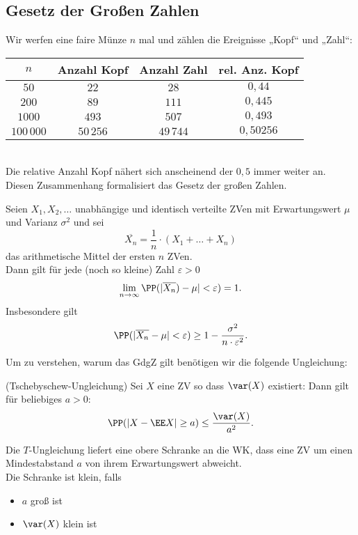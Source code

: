 \documentclass{scrreprt}
\begin{document}
\subsection{Gesetz der Großen Zahlen}
 Wir werfen eine faire Münze $n$ mal und zählen die Ereignisse „Kopf“ und „Zahl“:\\
\begin{tabular}{c | c | c | c}
	$n$ & Anzahl Kopf & Anzahl Zahl & rel. Anz. Kopf\\\hline
	$50$ & $22$ & $28$ & $0,44$\\
	$200$& $89$& $111$ & $0,445$\\
	$1000$ & $493$& $507$& $0,493$\\
	$100\,000$& $50\,256$&$49\,744$& $0,50256$
\end{tabular}\\
Die relative Anzahl Kopf nähert sich anscheinend der $0,5$ immer weiter an.\\
Diesen Zusammenhang formalisiert das Gesetz der großen Zahlen.

 Seien $X_1, X_2, \ldots$ unabhängige und identisch verteilte ZVen mit Erwartungswert $\mu$ und Varianz $\sigma^{2}$ und sei
\[ \overline{X_n}=\frac{1}{n}\cdot (X_1 + \ldots + X_n) \]
das arithmetische Mittel der ersten $n$ ZVen.\\
Dann gilt für jede (noch so kleine) Zahl $\varepsilon >0$
\[ \lim_{n\to \infty} \PP(|\overline{X_n}) -\mu| < \varepsilon) = 1 \text{.}\]
Insbesondere gilt
\[ \PP(|\overline{X_n}-\mu | < \varepsilon)\geq 1-\frac{\sigma^{2}}{n \cdot \varepsilon^{2}} \text{.} \]

Um zu verstehen, warum das GdgZ gilt benötigen wir die folgende Ungleichung:

 (Tschebyschew-Ungleichung) Sei $X$ eine ZV so dass $\var(X)$ existiert: Dann gilt für beliebiges $a>0$:
\[ \PP(|X-\EE X| \geq a) \leq \frac{\var(X)}{a^{2}} \text{.} \]

 Die $T$-Ungleichung liefert eine obere Schranke an die WK, dass eine ZV um einen Mindestabstand $a$ von ihrem Erwartungswert abweicht.\\
Die Schranke ist klein, falls
\begin{itemize}
	\item $a$ groß ist
	\item $\var(X)$ klein ist
\end{itemize}
\end{document}

